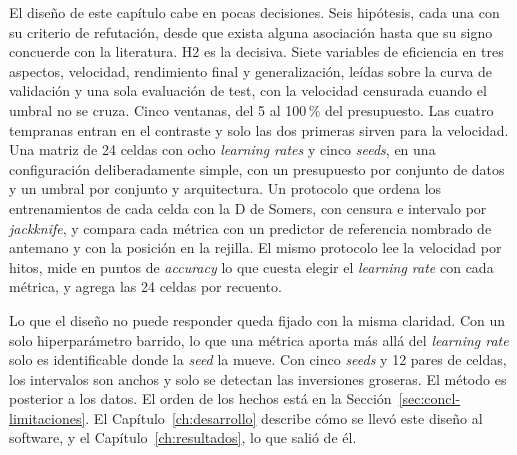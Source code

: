 El diseño de este capítulo cabe en pocas decisiones. Seis hipótesis, cada una con su criterio de refutación, desde que exista alguna asociación hasta que su signo concuerde con la literatura. H2 es la decisiva. Siete variables de eficiencia en tres aspectos, velocidad, rendimiento final y generalización, leídas sobre la curva de validación y una sola evaluación de test, con la velocidad censurada cuando el umbral no se cruza. Cinco ventanas, del 5 al 100\,\% del presupuesto. Las cuatro tempranas entran en el contraste y solo las dos primeras sirven para la velocidad. Una matriz de 24 celdas con ocho \emph{learning rates} y cinco \emph{seeds}, en una configuración deliberadamente simple, con un presupuesto por conjunto de datos y un umbral por conjunto y arquitectura. Un protocolo que ordena los entrenamientos de cada celda con la D de Somers, con censura e intervalo por \emph{jackknife}, y compara cada métrica con un predictor de referencia nombrado de antemano y con la posición en la rejilla. El mismo protocolo lee la velocidad por hitos, mide en puntos de \emph{accuracy} lo que cuesta elegir el \emph{learning rate} con cada métrica, y agrega las 24 celdas por recuento.

Lo que el diseño no puede responder queda fijado con la misma claridad. Con un solo hiperparámetro barrido, lo que una métrica aporta más allá del \emph{learning rate} solo es identificable donde la \emph{seed} la mueve. Con cinco \emph{seeds} y 12 pares de celdas, los intervalos son anchos y solo se detectan las inversiones groseras. El método es posterior a los datos. El orden de los hechos está en la Sección~\ref{sec:concl-limitaciones}. El Capítulo~\ref{ch:desarrollo} describe cómo se llevó este diseño al software, y el Capítulo~\ref{ch:resultados}, lo que salió de él.
